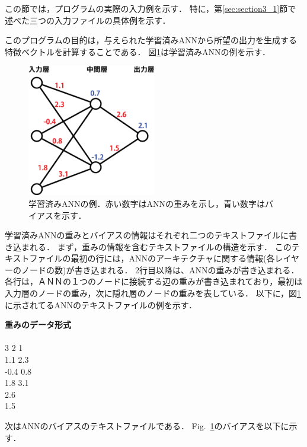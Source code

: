 \documentclass[11pt, titlepage, dvipdfmx, twoside]{jarticle}
\begin{document}
この節では，プログラムの実際の入力例を示す．
特に，第\ref{sec:section3_1}節で述べた三つの入力ファイルの具体例を示す．

このプログラムの目的は，与えられた学習済みANNから所望の出力を生成する特徴ベクトルを計算することである．
図\ref{fig:sample}は学習済みANNの例を示す．


\begin{figure}[H]
  \centering
  \includegraphics[width=0.5\textwidth]{./fig/ANN_sample_jp}
  \caption{学習済みANNの例．赤い数字はANNの重みを示し，青い数字はバイアスを示す．}
  \label{fig:sample}
\end{figure}


学習済みANNの重みとバイアスの情報はそれぞれ二つのテキストファイルに書き込まれる．
まず，重みの情報を含むテキストファイルの構造を示す．
このテキストファイルの最初の行には，ANNのアーキテクチャに関する情報(各レイヤーのノードの数)が書き込まれる．
2行目以降は、ANNの重みが書き込まれる．
各行は，ＡＮＮの１つのノードに接続する辺の重みが書き込まれており，最初は入力層のノードの重み，次に隠れ層のノードの重みを表している．
以下に，図\ref{fig:sample}に示されてるANNのテキストファイルの例を示す．

\bigskip

\begin{oframed}
{\bf 重みのデータ形式}\\\\
3 2 1\\
1.1 2.3\\
-0.4 0.8\\
1.8 3.1\\
2.6\\
1.5\\
\end{oframed}

\bigskip


次はANNのバイアスのテキストファイルである．
Fig.~\ref{fig:sample}のバイアスを以下に示す．
\end{document}
